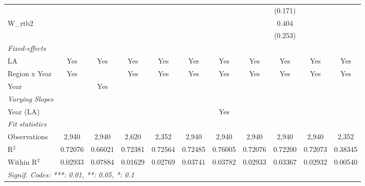 \begin{table}[htbp]
\begin{tabular}{lcccccccccc}
                    &               &               &              &               &                &              &               & (0.171)       &               &   \\   
      W\_rtb2       &               &               &              &               &                &              &               & 0.404         &               &   \\   
                    &               &               &              &               &                &              &               & (0.253)       &               &   \\   
      \midrule
      \emph{Fixed-effects}\\
      LA            & Yes           & Yes           & Yes          & Yes           & Yes            & Yes          & Yes           & Yes           & Yes           & Yes\\  
      Region x Year & Yes           &               & Yes          & Yes           & Yes            & Yes          & Yes           & Yes           & Yes           & Yes\\  
      Year          &               & Yes           &              &               &                &              &               &               &               & \\  
      \midrule
      \emph{Varying Slopes}\\
      Year (LA)     &               &               &              &               &                & Yes          &               &               &               & \\  
      \midrule
      \emph{Fit statistics}\\
      Observations  & 2,940         & 2,940         & 2,620        & 2,352         & 2,940          & 2,940        & 2,940         & 2,940         & 2,940         & 2,352\\  
      R$^2$         & 0.72076       & 0.66021       & 0.72381      & 0.72564       & 0.72485        & 0.76005      & 0.72076       & 0.72200       & 0.72073       & 0.38345\\  
      Within R$^2$  & 0.02933       & 0.07884       & 0.01629      & 0.02769       & 0.03741        & 0.03782      & 0.02933       & 0.03367       & 0.02932       & 0.00540\\  
      \midrule \midrule
      \multicolumn{11}{l}{\emph{Signif. Codes: ***: 0.01, **: 0.05, *: 0.1}}\\
   \end{tabular}
\end{table}


